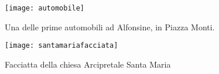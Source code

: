  \begin{figure}[htb]
    \centering
    \vspace{-0.3cm}
    \texttt{[image: automobile]}
    \caption[Automobile in piazza Monti]{Una delle prime automobili ad Alfonsine, in Piazza Monti.\label{fig:automobile}}
    \vspace{-0.7cm}
\end{figure}



 \begin{figure}[htb]
    \centering
    \texttt{[image: santamariafacciata]}
    \caption{Facciatta della chiesa Arcipretale Santa Maria\label{fig:santamariafacciata}}
    \vspace{-0.5cm}
\end{figure}





































%